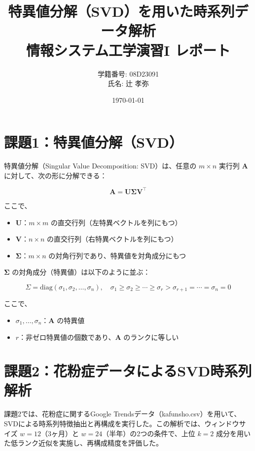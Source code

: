 \documentclass[a4paper,11pt]{jsarticle}
\title{特異値分解（SVD）を用いた時系列データ解析\\
\vspace{-2mm}情報システム工学演習I レポート}
\author{学籍番号: 08D23091\\氏名: 辻 孝弥}
\date{\today}
\begin{document}
\maketitle

\section{課題1：特異値分解（SVD）}

特異値分解（Singular Value Decomposition: SVD）は、任意の $m \times n$ 実行列 $\mathbf{A}$ に対して、次の形に分解できる：

\begin{equation}
\mathbf{A} = \mathbf{U} \mathbf{\Sigma} \mathbf{V}^\top
\end{equation}

ここで、

\begin{itemize}
  \item $\mathbf{U}$：$m \times m$ の直交行列（左特異ベクトルを列にもつ）
  \item $\mathbf{V}$：$n \times n$ の直交行列（右特異ベクトルを列にもつ）
  \item $\mathbf{\Sigma}$：$m \times n$ の対角行列であり、特異値を対角成分にもつ
\end{itemize}

$\mathbf{\Sigma}$ の対角成分（特異値）は以下のように並ぶ：

\begin{equation}
\Sigma = \text{diag}(\sigma_1, \sigma_2, \dots, \sigma_n), \quad \sigma_1 \geq \sigma_2 \geq \cdots \geq \sigma_r > \sigma_{r+1} = \cdots = \sigma_n = 0
\end{equation}

ここで、

\begin{itemize}
  \item $\sigma_1, \dots, \sigma_n$：$\mathbf{A}$ の特異値
  \item $r$：非ゼロ特異値の個数であり、$\mathbf{A}$ のランクに等しい
\end{itemize}

\section{課題2：花粉症データによるSVD時系列解析}

課題2では、花粉症に関するGoogle Trendsデータ（kafunsho.csv）を用いて、SVDによる時系列特徴抽出と再構成を実行した。この解析では、ウィンドウサイズ $w=12$（3ヶ月）と $w=24$（半年）の2つの条件で、上位 $k=2$ 成分を用いた低ランク近似を実施し、再構成精度を評価した。
\end{document}
